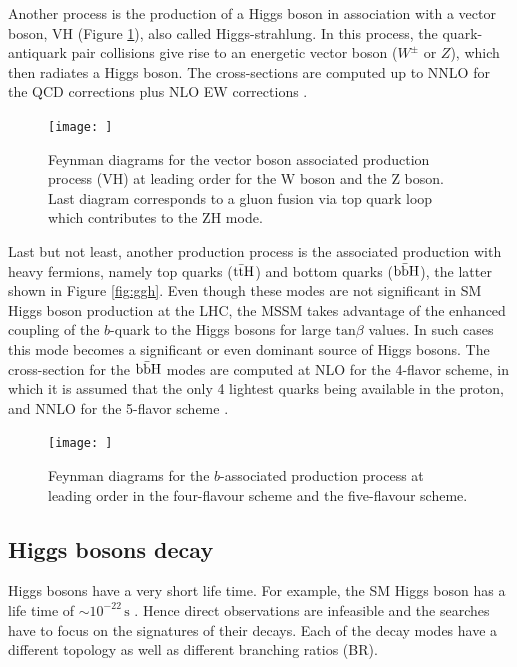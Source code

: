 Another process is the production of a Higgs boson in association with a vector boson, VH (Figure \ref{fig:vh}), also called Higgs-strahlung. In this process, the quark-antiquark pair collisions give rise to an energetic vector boson ($W^{\pm}$ or $Z$), which then radiates a Higgs boson. The cross-sections are computed up to NNLO for the QCD corrections plus NLO EW corrections \cite{deFlorian:2227475}.

\begin{figure}
    \centering
    \texttt{[image: ]}
    \caption{Feynman diagrams for the vector boson associated production process (VH) at leading order for the W boson and the Z boson. Last diagram corresponds to a gluon fusion via top quark loop which contributes to the ZH mode.}
    \label{fig:vh}
\end{figure}

Last but not least, another production process is the associated production with heavy fermions, namely top quarks ($\mathrm{t\Bar{t}H}$) and bottom quarks ($\mathrm{b\Bar{b}H}$), the latter shown in Figure \ref{fig:ggh}. Even though these modes are not significant in SM Higgs boson production at the LHC, the MSSM takes advantage of the enhanced coupling of the $b$-quark to the Higgs bosons for large $\mathrm{tan} \beta$ values. In such cases this mode becomes a significant or even dominant source of Higgs bosons. The cross-section for the $\mathrm{b\Bar{b}H}$ modes are computed at NLO for the 4-flavor scheme, in which it is assumed that the only 4 lightest quarks being available in the proton, and NNLO for the 5-flavor scheme \cite{deFlorian:2227475}.

\begin{figure}
    \centering
    \texttt{[image: ]}
    \caption{Feynman diagrams for the $b$-associated production process at leading order in the four-flavour scheme and the five-flavour scheme.}
    \label{fig:bbh}
\end{figure}

\subsection{Higgs bosons decay}

Higgs bosons have a very short life time. For example, the SM Higgs boson has a life time of $\sim 10^{-22} \, \mathrm{s}$ \cite{pdg2016}. Hence direct observations are infeasible and the searches have to focus on the signatures of their decays. Each of the decay modes have a different topology as well as different branching ratios (BR). 


